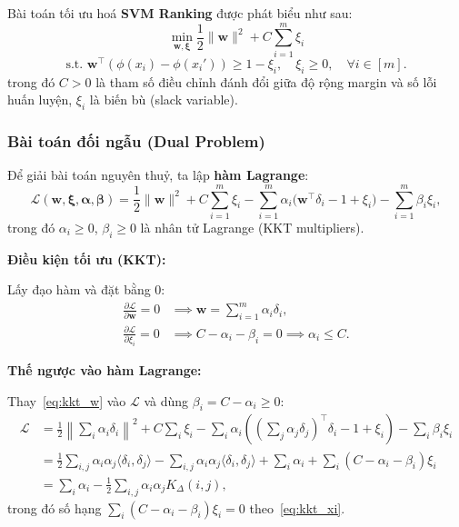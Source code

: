 \begin{definition}
\label{def:svmranking}
Bài toán tối ưu hoá \textbf{SVM Ranking} được phát biểu như sau:
\[
  \min_{\mathbf{w}, \boldsymbol{\xi}} 
  \frac{1}{2}\|\mathbf{w}\|^2 + C\sum_{i=1}^m \xi_i
\]
\[
  \text{s.t. } \mathbf{w}^\top(\phi(x_i) - \phi(x_i')) 
  \geq 1 - \xi_i, \quad \xi_i \geq 0, \quad \forall i \in [m].
\]
trong đó $C > 0$ là tham số điều chỉnh đánh đổi giữa độ rộng 
margin và số lỗi huấn luyện, $\xi_i$ là biến bù (slack variable).
\end{definition}

\subsubsection{Bài toán đối ngẫu (Dual Problem)}

Để giải bài toán nguyên thuỷ, ta lập 
\textbf{hàm Lagrange}:
\[
  \mathcal{L}(\mathbf{w}, \boldsymbol{\xi}, 
               \boldsymbol{\alpha}, \boldsymbol{\beta})
  = \frac{1}{2}\|\mathbf{w}\|^2 
  + C\sum_{i=1}^m \xi_i
  - \sum_{i=1}^m \alpha_i
    \bigl(\mathbf{w}^\top\delta_i - 1 + \xi_i\bigr)
  - \sum_{i=1}^m \beta_i \xi_i,
\]
trong đó $\alpha_i \geq 0$, $\beta_i \geq 0$ là 
nhân tử Lagrange (KKT multipliers).

\textbf{Điều kiện tối ưu (KKT):}

Lấy đạo hàm và đặt bằng 0:
\begin{align}
  \frac{\partial \mathcal{L}}{\partial \mathbf{w}} = 0 
  &\implies \mathbf{w} = \sum_{i=1}^m \alpha_i \delta_i,
  \label{eq:kkt_w} \\
  \frac{\partial \mathcal{L}}{\partial \xi_i} = 0 
  &\implies C - \alpha_i - \beta_i = 0 
   \implies \alpha_i \leq C.
  \label{eq:kkt_xi}
\end{align}

\textbf{Thế ngược vào hàm Lagrange:}

Thay~\eqref{eq:kkt_w} vào $\mathcal{L}$ và dùng 
$\beta_i = C - \alpha_i \geq 0$:
\begin{align*}
  \mathcal{L} 
  &= \frac{1}{2}\left\|\sum_i\alpha_i\delta_i\right\|^2
  + C\sum_i\xi_i
  - \sum_i\alpha_i\left(
      \left(\sum_j\alpha_j\delta_j\right)^\top\!\delta_i 
      - 1 + \xi_i
    \right)
  - \sum_i\beta_i\xi_i \\
  &= \frac{1}{2}\sum_{i,j}\alpha_i\alpha_j
       \langle\delta_i,\delta_j\rangle
  - \sum_{i,j}\alpha_i\alpha_j
       \langle\delta_i,\delta_j\rangle
  + \sum_i\alpha_i
  + \sum_i(C - \alpha_i - \beta_i)\xi_i \\
  &= \sum_i\alpha_i 
  - \frac{1}{2}\sum_{i,j}\alpha_i\alpha_j K_\Delta(i,j),
\end{align*}
trong đó số hạng $\sum_i(C-\alpha_i-\beta_i)\xi_i = 0$ 
theo~\eqref{eq:kkt_xi}.

